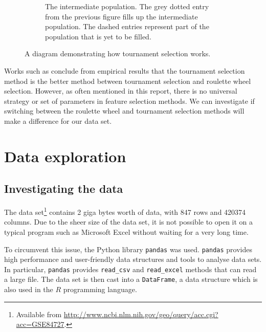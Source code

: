 \documentclass[12pt, twoside, a4paper]{report}
\begin{document}
\begin{figure}
\begin{subfigure}[b]{\textwidth}
\centering
{}
\caption{The intermediate population. The grey dotted entry from the previous figure fills up the intermediate population. The dashed entries represent part of the population that is yet to be filled.}
\label{bg:ga:tour_b}
\end{subfigure}

\caption{A diagram demonstrating how tournament selection works.}
\label{bg:ga:tour}
\end{figure}

Works such as \cite{RefWorks:245, RefWorks:246} conclude from empirical results that the tournament selection method is the better method between tournament selection and roulette wheel selection. However, as often mentioned in this report, there is no universal strategy or set of parameters in feature selection methods. We can investigate if switching between the roulette wheel and tournament selection methods will make a difference for our data set.


\chapter{Data exploration}
\section{Investigating the data} \label{data:understanding}

The data set\footnote{Available from \url{http://www.ncbi.nlm.nih.gov/geo/query/acc.cgi?acc=GSE84727}.} contains 2 giga bytes worth of data, with 847 rows and 420374 columns. Due to the sheer size of the data set, it is not possible to open it on a typical program such as Microsoft Excel without waiting for a very long time.

To circumvent this issue, the Python library \texttt{pandas} \cite{RefWorks:213} was used. \texttt{pandas} provides high performance and user-friendly data structures and tools to analyse data sets. In particular, \texttt{pandas} provides \texttt{read\_csv} and \texttt{read\_excel} methods that can read a large file. The data set is then cast into a \texttt{DataFrame}, a data structure which is also used in the $R$ programming language.
\end{document}
